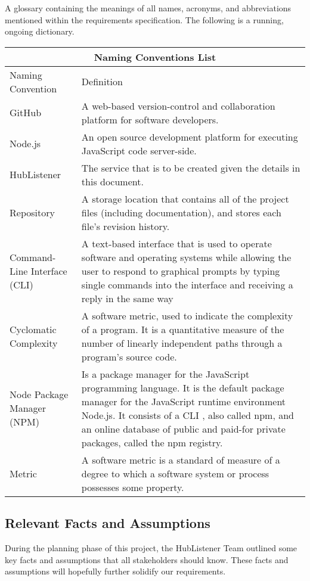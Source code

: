 \documentclass{article}
\begin{document}
A glossary containing the meanings of all names, acronyms, and abbreviations mentioned within the requirements specification. The following is a running, ongoing dictionary. 
\newline
\begin{tabular}{ |p{6cm}||p{6cm}| }
\hline
\multicolumn{2}{|c|}{Naming Conventions List} \\
\hline
Naming Convention & Definition\\
\hline 
GitHub & A web-based version-control and collaboration platform for software developers. \\
\hline
Node.js & An open source development platform for executing JavaScript code server-side. \\
\hline
HubListener & The service that is to be created given the details in this document.\\
\hline
Repository &  A storage location that contains all of the project files (including documentation), and stores each file's revision history. \\
\hline
Command-Line Interface (CLI) & A text-based interface that is used to operate software and operating systems while allowing the user to respond to graphical prompts by typing single commands into the interface and receiving a reply in the same way\\
\hline
Cyclomatic Complexity & A software metric, used to indicate the complexity of a program. It is a quantitative measure of the number of linearly independent paths through a program's source code.\\
\hline 
Node Package Manager (NPM) & Is a package manager for the JavaScript programming language. It is the default package manager for the JavaScript runtime environment Node.js. It consists of a CLI , also called npm, and an online database of public and paid-for private packages, called the npm registry.\\
\hline 
Metric &A software metric is a standard of measure of a degree to which a software system or process possesses some property.\\
\hline 
\end{tabular}
\newpage

\subsection{Relevant Facts and Assumptions}
During the planning phase of this project, the HubListener Team outlined some key facts and assumptions that all stakeholders should know. These facts and assumptions will hopefully further solidify our requirements. \newline
\end{document}
